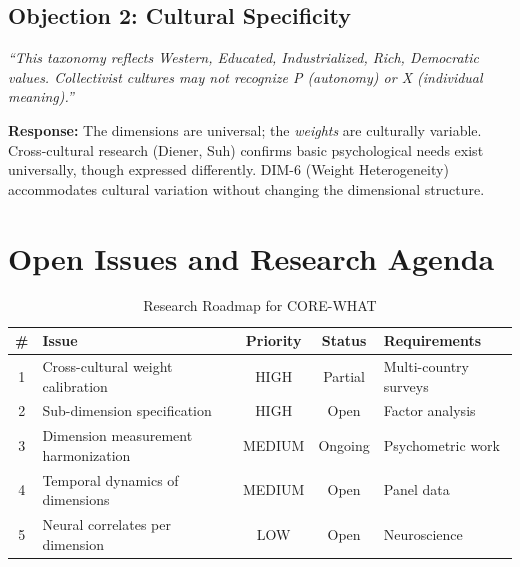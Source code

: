 \subsection{Objection 2: Cultural Specificity}

\begin{tcolorbox}[colback=red!5!white, colframe=red!50!black,
    title=Objection: WEIRD Bias]
\textit{``This taxonomy reflects Western, Educated, Industrialized, Rich, Democratic
values. Collectivist cultures may not recognize P (autonomy) or X (individual meaning).''}
\end{tcolorbox}

\textbf{Response:}
The dimensions are universal; the \textit{weights} are culturally variable.
Cross-cultural research (Diener, Suh) confirms basic psychological needs exist
universally, though expressed differently. DIM-6 (Weight Heterogeneity) accommodates
cultural variation without changing the dimensional structure.


\section{Open Issues and Research Agenda}
\label{sec:what-open}

\begin{table}[htbp]
\centering
\caption{Research Roadmap for CORE-WHAT}
\label{tab:what-roadmap}
\renewcommand{\arraystretch}{1.3}
\begin{tabular}{@{}clccl@{}}
\toprule
\textbf{\#} & \textbf{Issue} & \textbf{Priority} & \textbf{Status} & \textbf{Requirements} \\
\midrule
1 & Cross-cultural weight calibration & HIGH & Partial & Multi-country surveys \\
2 & Sub-dimension specification & HIGH & Open & Factor analysis \\
3 & Dimension measurement harmonization & MEDIUM & Ongoing & Psychometric work \\
4 & Temporal dynamics of dimensions & MEDIUM & Open & Panel data \\
5 & Neural correlates per dimension & LOW & Open & Neuroscience \\
\bottomrule
\end{tabular}
\end{table}


